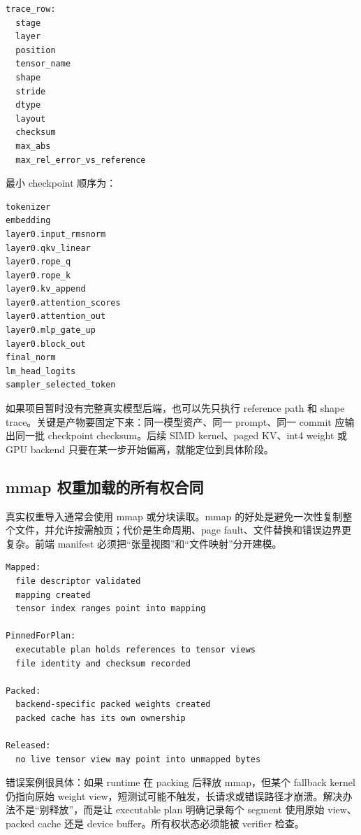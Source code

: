 \begin{lstlisting}[numbers=none,caption={真实模型 first-token trace schema}]
trace_row:
  stage
  layer
  position
  tensor_name
  shape
  stride
  dtype
  layout
  checksum
  max_abs
  max_rel_error_vs_reference
\end{lstlisting}

最小 checkpoint 顺序为：

\begin{lstlisting}[numbers=none,caption={first-token trace checkpoint}]
tokenizer
embedding
layer0.input_rmsnorm
layer0.qkv_linear
layer0.rope_q
layer0.rope_k
layer0.kv_append
layer0.attention_scores
layer0.attention_out
layer0.mlp_gate_up
layer0.block_out
final_norm
lm_head_logits
sampler_selected_token
\end{lstlisting}

如果项目暂时没有完整真实模型后端，也可以先只执行 reference path 和 shape trace。关键是产物要固定下来：同一模型资产、同一 prompt、同一 commit 应输出同一批 checkpoint checksum。后续 SIMD kernel、paged KV、int4 weight 或 GPU backend 只要在某一步开始偏离，就能定位到具体阶段。

\subsection{mmap 权重加载的所有权合同}

真实权重导入通常会使用 mmap 或分块读取。mmap 的好处是避免一次性复制整个文件，并允许按需触页；代价是生命周期、page fault、文件替换和错误边界更复杂。前端 manifest 必须把“张量视图”和“文件映射”分开建模。

\begin{lstlisting}[numbers=none,caption={mmap 权重所有权状态机}]
Mapped:
  file descriptor validated
  mapping created
  tensor index ranges point into mapping

PinnedForPlan:
  executable plan holds references to tensor views
  file identity and checksum recorded

Packed:
  backend-specific packed weights created
  packed cache has its own ownership

Released:
  no live tensor view may point into unmapped bytes
\end{lstlisting}

错误案例很具体：如果 runtime 在 packing 后释放 mmap，但某个 fallback kernel 仍指向原始 weight view，短测试可能不触发，长请求或错误路径才崩溃。解决办法不是“别释放”，而是让 executable plan 明确记录每个 segment 使用原始 view、packed cache 还是 device buffer。所有权状态必须能被 verifier 检查。

